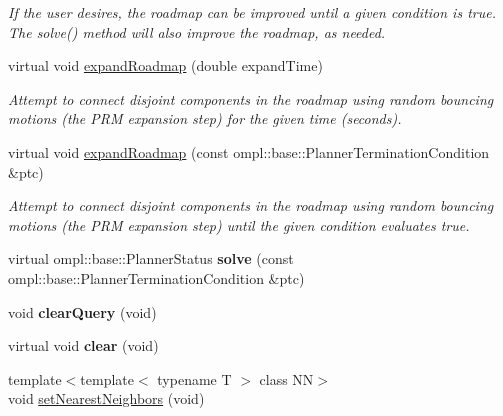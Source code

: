 \begin{DoxyCompactItemize}
\begin{DoxyCompactList}\small\item\em \-If the user desires, the roadmap can be improved until a given condition is true. \-The solve() method will also improve the roadmap, as needed. \end{DoxyCompactList}\item 
\hypertarget{class_f_i_r_m_ad9cd5472a8bd1b1fcb83763128f7fd75}{virtual void \hyperlink{class_f_i_r_m_ad9cd5472a8bd1b1fcb83763128f7fd75}{expand\-Roadmap} (double expand\-Time)}\label{class_f_i_r_m_ad9cd5472a8bd1b1fcb83763128f7fd75}

\begin{DoxyCompactList}\small\item\em \-Attempt to connect disjoint components in the roadmap using random bouncing motions (the \-P\-R\-M expansion step) for the given time (seconds). \end{DoxyCompactList}\item 
\hypertarget{class_f_i_r_m_aac520fbbb43b0e3100498aa29117f0b9}{virtual void \hyperlink{class_f_i_r_m_aac520fbbb43b0e3100498aa29117f0b9}{expand\-Roadmap} (const ompl\-::base\-::\-Planner\-Termination\-Condition \&ptc)}\label{class_f_i_r_m_aac520fbbb43b0e3100498aa29117f0b9}

\begin{DoxyCompactList}\small\item\em \-Attempt to connect disjoint components in the roadmap using random bouncing motions (the \-P\-R\-M expansion step) until the given condition evaluates true. \end{DoxyCompactList}\item 
\hypertarget{class_f_i_r_m_a4490bf7d770637936f990ee96eeaeb89}{virtual ompl\-::base\-::\-Planner\-Status {\bfseries solve} (const ompl\-::base\-::\-Planner\-Termination\-Condition \&ptc)}\label{class_f_i_r_m_a4490bf7d770637936f990ee96eeaeb89}

\item 
\hypertarget{class_f_i_r_m_acf7c24814ea6b8cad9cad350dea66560}{void {\bfseries clear\-Query} (void)}\label{class_f_i_r_m_acf7c24814ea6b8cad9cad350dea66560}

\item 
\hypertarget{class_f_i_r_m_a0028d56cac8cd7970b77836993a9d6fb}{virtual void {\bfseries clear} (void)}\label{class_f_i_r_m_a0028d56cac8cd7970b77836993a9d6fb}

\item 
\hypertarget{class_f_i_r_m_a8dd7c5ed3fa065f5f37d79bc1d220474}{{\footnotesize template$<$template$<$ typename T $>$ class \-N\-N$>$ }\\void \hyperlink{class_f_i_r_m_a8dd7c5ed3fa065f5f37d79bc1d220474}{set\-Nearest\-Neighbors} (void)}\label{class_f_i_r_m_a8dd7c5ed3fa065f5f37d79bc1d220474}


\end{DoxyCompactItemize}
